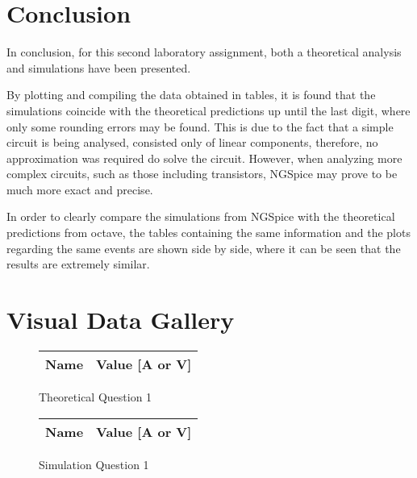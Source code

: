 \section{Conclusion}
\label{sec:conclusion}

In conclusion, for this second laboratory assignment, both a theoretical analysis and simulations have been presented. \par
By plotting and compiling the data obtained in tables, it is found that the simulations coincide with the theoretical predictions up until the last digit, where only some rounding errors may be found. This is due to the fact that a simple circuit is being analysed, consisted only of linear components, therefore, no approximation was required do solve the circuit. However, when analyzing more complex circuits, such as those including transistors, NGSpice may prove to be much more exact and precise. \par
In order to clearly compare the simulations from NGSpice with the theoretical predictions from octave, the tables containing the same information and the plots regarding the same events are shown side by side, where it can be seen that the results are extremely similar.

\newpage
\section{Visual Data Gallery}
\vspace{1cm}
\begin{figure}[H]
      \centering
      \begin{tabular}{ | c | c | }
      \hline    
      {\bf Name} & {\bf Value [A or V]} \\ \hline
      
      \hline
      \end{tabular}
      \caption{Theoretical Question 1}
    \endminipage\hfill
      \centering
      \begin{tabular}{ | c | c | }
      \hline    
      {\bf Name} & {\bf Value [A or V]} \\ \hline
      
      \end{tabular}
      \caption{Simulation Question 1}
    \endminipage\hfill
\end{figure}

